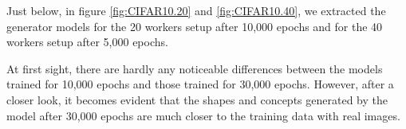 Just below, in figure \ref{fig:CIFAR10.20} and \ref{fig:CIFAR10.40}, we extracted the generator models for the 20 workers setup after 10,000 epochs and for the 40 workers setup after 5,000 epochs.

At first sight, there are hardly any noticeable differences between the models trained for 10,000 epochs and those trained for 30,000 epochs. However, after a closer look, it becomes evident that the shapes and concepts generated by the model after 30,000 epochs are much closer to the training data with real images.

\begin{multicols}{3}
\end{multicols}

\begin{multicols}{2}
\end{multicols}
